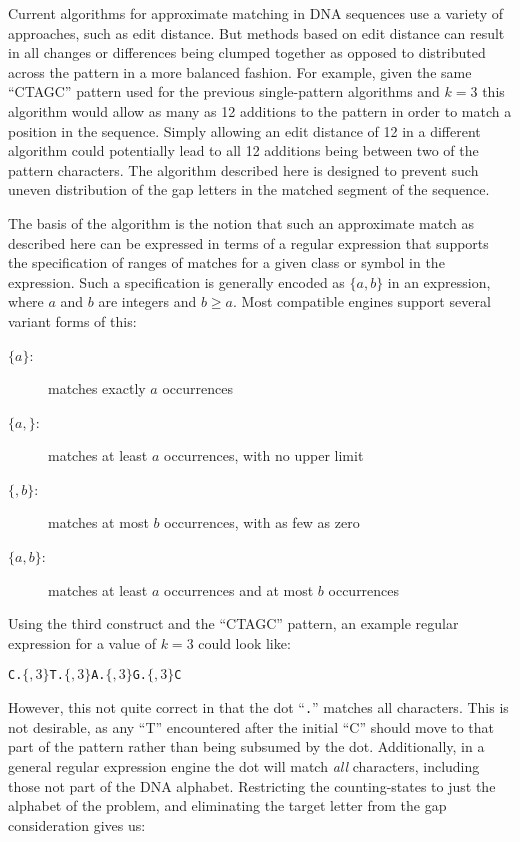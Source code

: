 Current algorithms for approximate matching in DNA sequences use a variety of approaches, such as edit distance. But methods based on edit distance can result in all changes or differences being clumped together as opposed to distributed across the pattern in a more balanced fashion. For example, given the same ``CTAGC'' pattern used for the previous single-pattern algorithms and $k = 3$ this algorithm would allow as many as 12 additions to the pattern in order to match a position in the sequence. Simply allowing an edit distance of 12 in a different algorithm could potentially lead to all 12 additions being between two of the pattern characters. The algorithm described here is designed to prevent such uneven distribution of the gap letters in the matched segment of the sequence.

The basis of the algorithm is the notion that such an approximate match as described here can be expressed in terms of a regular expression that supports the specification of ranges of matches for a given class or symbol in the expression. Such a specification is generally encoded as \texttt{$\lbrace a,b \rbrace$} in an expression, where $a$ and $b$ are integers and $b \geq a$. Most compatible engines support several variant forms of this:

\begin{description}
\item[\texttt{$\lbrace a \rbrace$}:] matches exactly $a$ occurrences
\item[\texttt{$\lbrace a, \rbrace$}:] matches at least $a$ occurrences, with no upper limit
\item[\texttt{$\lbrace ,b \rbrace$}:] matches at most $b$ occurrences, with as few as zero
\item[\texttt{$\lbrace a,b \rbrace$}:] matches at least $a$ occurrences and at most $b$ occurrences
\end{description}

Using the third construct and the ``CTAGC'' pattern, an example regular expression for a value of $k = 3$ could look like:

\begin{center}
\texttt{C.$\lbrace ,3 \rbrace$T.$\lbrace ,3 \rbrace$A.$\lbrace ,3 \rbrace$G.$\lbrace ,3 \rbrace$C}
\end{center}

However, this not quite correct in that the dot ``\texttt{.}'' matches all characters. This is not desirable, as any ``T'' encountered after the initial ``C'' should move to that part of the pattern rather than being subsumed by the dot. Additionally, in a general regular expression engine the dot will match \textit{all} characters, including those not part of the DNA alphabet. Restricting the counting-states to just the alphabet of the problem, and eliminating the target letter from the gap consideration gives us:

